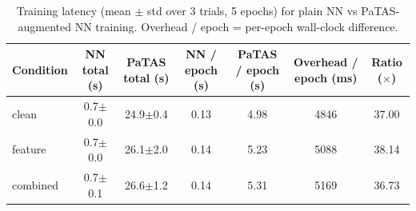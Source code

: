 \begin{table}[ht]
\centering
\caption{Training latency (mean $\pm$ std over 3 trials, 5 epochs) for plain NN vs PaTAS-augmented NN training. Overhead / epoch = per-epoch wall-clock difference.}
\label{tab:latency-training}
\begin{tabular}{lcccccc}
\toprule
Condition & NN total (s) & PaTAS total (s) & NN / epoch (s) & PaTAS / epoch (s) & Overhead / epoch (ms) & Ratio ($\times$) \\
\midrule
clean & 0.7$\pm$0.0 & 24.9$\pm$0.4 & 0.13 & 4.98 & 4846 & 37.00 \\
feature & 0.7$\pm$0.0 & 26.1$\pm$2.0 & 0.14 & 5.23 & 5088 & 38.14 \\
combined & 0.7$\pm$0.1 & 26.6$\pm$1.2 & 0.14 & 5.31 & 5169 & 36.73 \\
\bottomrule
\end{tabular}
\end{table}